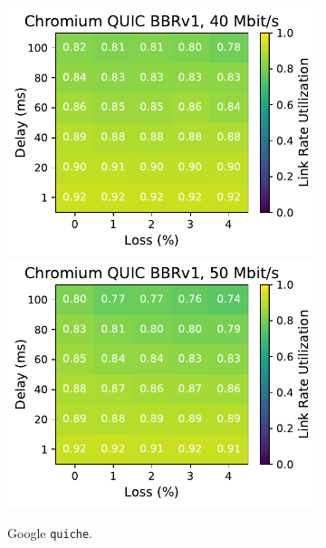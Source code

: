 \begin{figure}[ht]
\begin{subfigure}[b]{0.22\linewidth}
        \includegraphics[width=\linewidth,trim={0 0 2cm 0},clip]{splitting-paper/figures/heatmaps/heatmap_quic_bbr1_40mbps.pdf}
        \includegraphics[width=\linewidth,trim={0 0 2cm 0},clip]{splitting-paper/figures/heatmaps/heatmap_quic_bbr1_50mbps.pdf}
        \caption{Google \texttt{quiche}.}
    \end{subfigure}
    \begin{subfigure}[b]{0.22\linewidth}

\end{subfigure}
\end{figure}
